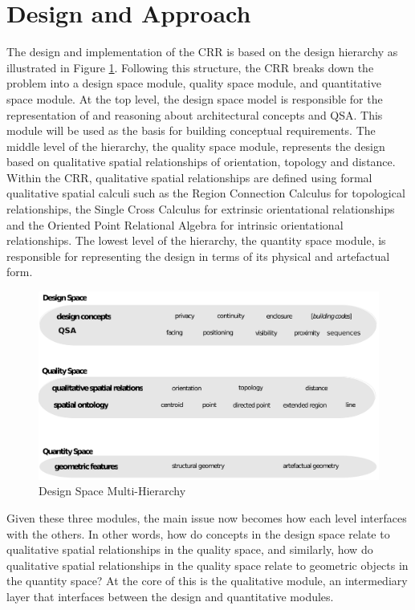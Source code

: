 \documentclass[12pt]{ucthesis}
\begin{document}
\section{Design and Approach}
The design and implementation of the CRR is based on the design hierarchy as illustrated in Figure \ref{hierarchy no-links}. Following this structure, the CRR breaks down the problem into a design space module, quality space module, and quantitative space module. At the top level, the design space model is responsible for the representation of and reasoning about architectural concepts and QSA. This module will be used as the basis for building conceptual requirements. The middle level of the hierarchy, the quality space module, represents the design based on qualitative spatial relationships of orientation, topology and distance. Within the CRR, qualitative spatial relationships are defined using formal qualitative spatial calculi such as the Region Connection Calculus for topological relationships, the Single Cross Calculus for extrinsic orientational relationships and the Oriented Point Relational Algebra for intrinsic orientational relationships. The lowest level of the hierarchy, the quantity space module, is responsible for representing the design in terms of its physical and artefactual form.

\begin{figure}[t]
\centering
\includegraphics[width=140mm]{spatial-qualities-hierarchy-nolinks}
\caption{Design Space Multi-Hierarchy}
\label{hierarchy no-links}
\end{figure}

Given these three modules, the main issue now becomes how each level interfaces with the others. In other words, how do concepts in the design space relate to qualitative spatial relationships in the quality space, and similarly, how do qualitative spatial relationships in the quality space relate to geometric objects in the quantity space? At the core of this is the qualitative module, an intermediary layer that interfaces between the design and quantitative modules. 
\end{document}
